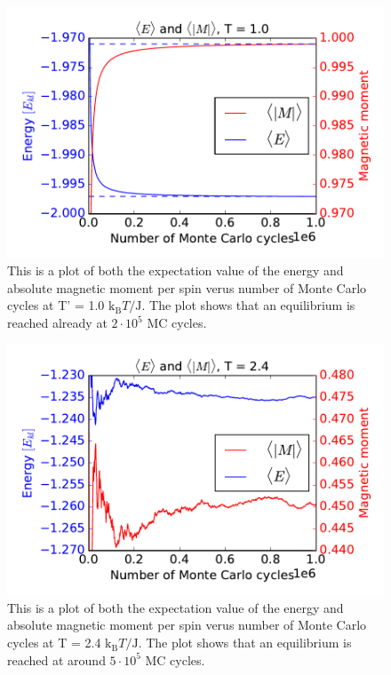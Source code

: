 \begin{figure}[H]
\includegraphics[width=\linewidth]{../results/4c/En_mag_T1_0}\caption{This is a plot of both the expectation value of the energy and absolute magnetic moment per spin verus number of Monte Carlo cycles at T' = 1.0 $\text{k}_\text{B}T/\text{J}$. The plot shows that an equilibrium is reached already at $2 \cdot 10^{5}$ MC cycles.}\label{fig:L_20_energy_mag_T_1.0}
\end{figure}

\begin{figure}[H]
\includegraphics[width=\linewidth]{../results/4c/En_mag_T2_4}\caption{This is a plot of both the expectation value of the energy and absolute magnetic moment per spin verus number of Monte Carlo cycles at T = 2.4 $\text{k}_\text{B}T/\text{J}$. The plot shows that an equilibrium is reached at around $5 \cdot 10^{5}$ MC cycles.}\label{fig:L_20_energy_mag_T_2.4}
\end{figure}


